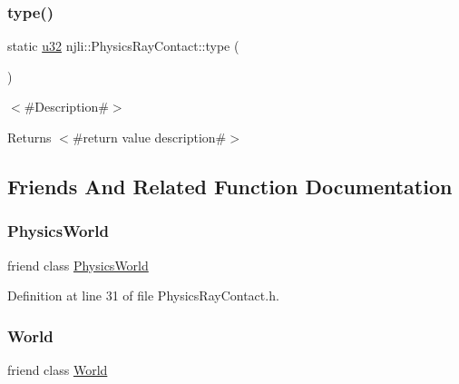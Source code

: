 \subsubsection{\texorpdfstring{type()}{type()}}
{\footnotesize\ttfamily static \mbox{\hyperlink{_util_8h_a10e94b422ef0c20dcdec20d31a1f5049}{u32}} njli\+::\+Physics\+Ray\+Contact\+::type (\begin{DoxyParamCaption}{ }\end{DoxyParamCaption})\hspace{0.3cm}{\ttfamily [static]}}

$<$\#\+Description\#$>$

\begin{DoxyReturn}{Returns}
$<$\#return value description\#$>$ 
\end{DoxyReturn}


\subsection{Friends And Related Function Documentation}
\mbox{\label{classnjli_1_1_physics_ray_contact_abd7959b8cbcd7c25bc6c0c8b1ea26ce6}} 
\subsubsection{\texorpdfstring{Physics\+World}{PhysicsWorld}}
{\footnotesize\ttfamily friend class \mbox{\hyperlink{classnjli_1_1_physics_world}{Physics\+World}}\hspace{0.3cm}{\ttfamily [friend]}}



Definition at line 31 of file Physics\+Ray\+Contact.\+h.

\mbox{\label{classnjli_1_1_physics_ray_contact_a7b4bcdf992c21ae83363f25df05b1d25}} 
\subsubsection{\texorpdfstring{World}{World}}
{\footnotesize\ttfamily friend class \mbox{\hyperlink{classnjli_1_1_world}{World}}\hspace{0.3cm}{\ttfamily [friend]}}



